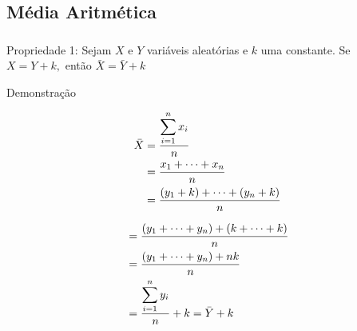 \documentclass[14pt,aspectratio=1610]{beamer}
\begin{document}
\subsection{Média Aritmética}
\begin{frame}{}
	\small
\frametitle{}
\begin{block}{Propriedade 1:}
\justifying
Sejam $X$ e $Y$ variáveis aleatórias e $k$ uma constante. Se $X=Y+k,$ então $\bar{X}=\bar{Y}+k$
\end{block}
\pause
\begin{block}{Demonstração}
\begin{minipage}{0.4\textwidth}
\begin{align*}
\bar{X}&=\dfrac{{\displaystyle \sum_{i=1}^{n}x_{i}}}{n}\\ 
\vspace{0.1cm}
       &=\dfrac{x_{1}+\cdots+x_{n}}{n}\\ \vspace{0.1cm}
       &=\dfrac{(y_{1}+k)+\cdots+(y_{n}+k)}{n}\\
\end{align*}
\end{minipage}\pause\hfill
\begin{minipage}{0.4\textwidth}
\begin{align*}
&=\dfrac{(y_{1}+\cdots+y_{n})+
(k+\cdots+k)}{n}\\ \vspace{0.1cm}
&=\dfrac{(y_{1}+\cdots+y_{n})+
nk}{n}\\ \vspace{0.1cm}
&=\dfrac{{\displaystyle \sum_{i=1}^{n}y_{i}}}{n}+k=\bar{Y}+k
\end{align*}
\end{minipage}
\end{block}
\end{frame}
\end{document}
